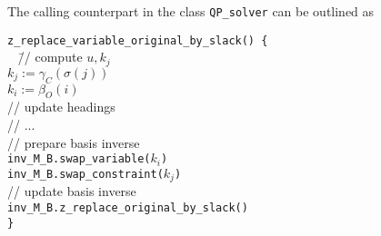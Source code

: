 \documentclass[a4paper]{article}
\begin{document}
The calling counterpart in the class \texttt{QP\_solver} can be outlined as
\begin{tabbing}
\texttt{z\_replace\_variable\_original\_by\_slack() \{} \\
\texttt{  } \= // compute $u, k_{j}$ \\
\> \texttt{$k_{j}:=\gamma_{C}(\sigma(j))$} \\
\> \texttt{$k_{i}:=\beta_{O}(i)$} \\
\> // update headings \\
\> // ... \\
\> // prepare basis inverse \\
\> \texttt{inv\_M\_B.swap\_variable($k_{i}$)} \\
\> \texttt{inv\_M\_B.swap\_constraint($k_{j}$)}\\
\> // update basis inverse \\
\> \texttt{inv\_M\_B.z\_replace\_original\_by\_slack()}
\\
\texttt{\}}
\end{tabbing}
\end{document}
